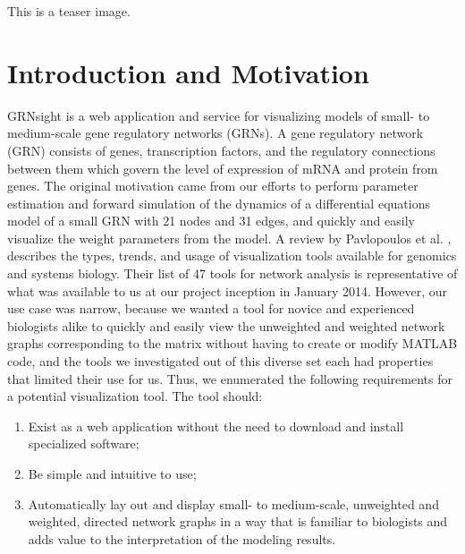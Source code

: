 \documentclass[sigconf,review,anonymous]{acmart}
\begin{document}



\begin{teaserfigure}
  \caption{This is a teaser image.}
  \label{fig:teaser}
\end{teaserfigure}


\maketitle

\section{Introduction and Motivation}

GRNsight is a web application and service for visualizing models of small- to medium-scale gene regulatory networks (GRNs). A gene regulatory network (GRN) consists of genes, transcription factors, and the regulatory connections between them which govern the level of expression of mRNA and protein from genes. The original motivation came from our efforts to perform parameter estimation and forward simulation of the dynamics of a differential equations model of a small GRN with 21 nodes and 31 edges, and quickly and easily visualize the weight parameters from the model. A review by Pavlopoulos et al. \cite{doi:10.1186/s13742-015-0077-2}, describes the types, trends, and usage of visualization tools available for genomics and systems biology. Their list of 47 tools for network analysis is representative of what was available to us at our project inception in January 2014. However, our use case was narrow, because we wanted a tool for novice and experienced biologists alike to quickly and easily view the unweighted and weighted network graphs corresponding to the matrix without having to create or modify MATLAB code, and the tools we investigated out of this diverse set each had properties that limited their use for us. Thus, we enumerated the following requirements for a potential visualization tool. The tool should:

\begin{enumerate}
\item Exist as a web application without the need to download and install specialized software;
\item Be simple and intuitive to use;
\item Automatically lay out and display small- to medium-scale, unweighted and weighted, directed network graphs in a way that is familiar to biologists and adds value to the interpretation of the modeling results.
\end{enumerate}
\end{document}
